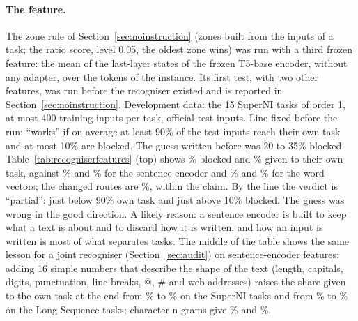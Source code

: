 \paragraph{The feature.} The zone rule of Section~\ref{sec:noinstruction} (zones built from the inputs of a task; the ratio score, level 0.05, the oldest zone wins) was run with a third frozen feature: the mean of the last-layer states of the frozen T5-base encoder, without any adapter, over the tokens of the instance.
Its first test, with two other features, was run before the recogniser existed and is reported in Section~\ref{sec:noinstruction}.
Development data: the 15 SuperNI tasks of order 1, at most 400 training inputs per task, official test inputs.
Line fixed before the run: ``works'' if on average at least 90\% of the test inputs reach their own task and at most 10\% are blocked.
The guess written before was 20 to 35\% blocked.
Table~\ref{tab:recogniserfeatures} (top) shows \AudZoneFrozenTBlocked{}\% blocked and \AudZoneFrozenTOwn{}\% given to their own task, against \AudZoneSentenceBlocked{}\% and \AudZoneSentenceOwn{}\% for the sentence encoder and \AudZoneWordVecBlocked{}\% and \AudZoneWordVecOwn{}\% for the word vectors; the changed routes are \AudZoneFrozenTChanged{}\%, within the claim.
By the line the verdict is ``partial'': just below 90\% own task and just above 10\% blocked.
The guess was wrong in the good direction.
A likely reason: a sentence encoder is built to keep what a text is about and to discard how it is written, and how an input is written is most of what separates tasks.
The middle of the table shows the same lesson for a joint recogniser (Section~\ref{sec:audit}) on sentence-encoder features: adding 16 simple numbers that describe the shape of the text (length, capitals, digits, punctuation, line breaks, @, \# and web addresses) raises the share given to the own task at the end from \AudRecLrMiniEndSuperni{}\% to \AudRecLrShapeEndSuperni{}\% on the SuperNI tasks and from \AudRecLrMiniEndLong{}\% to \AudRecLrShapeEndLong{}\% on the Long Sequence tasks; character n-grams give \AudRecLrCharEndSuperni{}\% and \AudRecLrCharEndLong{}\%.

